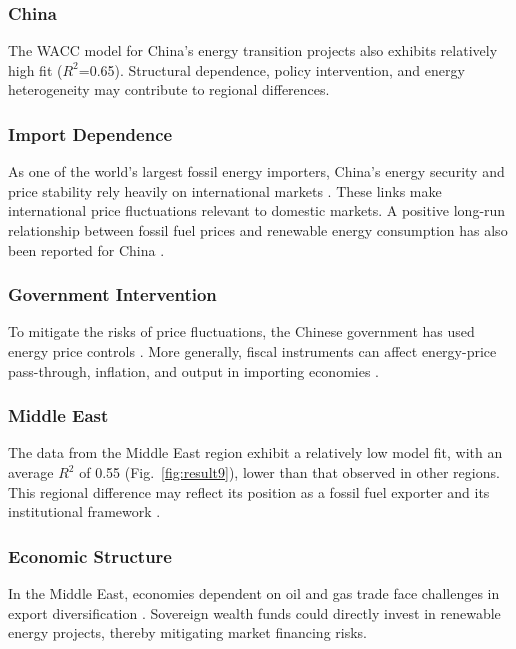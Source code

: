 \subsubsection{China}

The WACC model for China's energy transition projects also exhibits relatively high fit ($R^2$=0.65). Structural dependence, policy intervention, and energy heterogeneity may contribute to regional differences.

\subsubsection{Import Dependence}

As one of the world's largest fossil energy importers, China's energy security and price stability rely heavily on international markets \cite{SUN2022121642,WANG2023128724}. These links make international price fluctuations relevant to domestic markets. A positive long-run relationship between fossil fuel prices and renewable energy consumption has also been reported for China \cite{ben2022assessing}.

\subsubsection{Government Intervention}

To mitigate the risks of price fluctuations, the Chinese government has used energy price controls \cite{HE2017524}. More generally, fiscal instruments can affect energy-price pass-through, inflation, and output in importing economies \cite{GLOCKER2024103201}.

\subsubsection{Middle East}

The data from the Middle East region exhibit a relatively low model fit, with an average $R^2$ of 0.55 (Fig.~\ref{fig:result9}), lower than that observed in other regions. This regional difference may reflect its position as a fossil fuel exporter and its institutional framework \cite{karanfil2023energy,FATTOUH2013108}.

\subsubsection{Economic Structure}

In the Middle East, economies dependent on oil and gas trade face challenges in export diversification \cite{karanfil2023energy}. Sovereign wealth funds could directly invest in renewable energy projects, thereby mitigating market financing risks.

